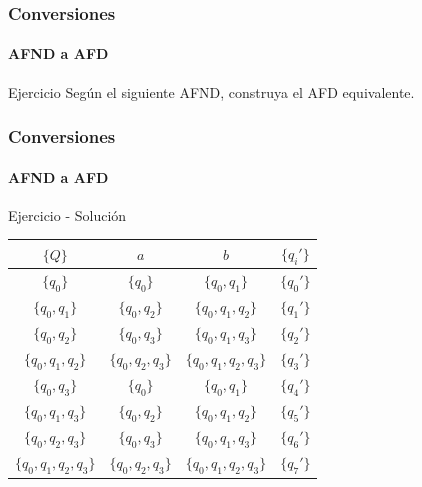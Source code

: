 \documentclass{beamer}
\begin{document}
        \begin{frame}
			\frametitle{Conversiones}
			\framesubtitle{AFND a AFD}

            \begin{exampleblock}{Ejercicio}
               Seg\'un el siguiente AFND, construya el AFD equivalente.
               \begin{center}
			   \end{center}
            \end{exampleblock}
		\end{frame}		
		
        \begin{frame}
			\frametitle{Conversiones}
			\framesubtitle{AFND a AFD}

            \begin{exampleblock}{Ejercicio - Soluci\'on}
               \begin{table}
                   \begin{center}
                       \begin{tabular}{c|c|c|c} 
                           $\{Q\}$ & $a$ & $b$ & $\{q_{i}'\}$ \\ \hline
                           $\{q_{0}\}$ & $\{q_{0}\}$ & $\{q_{0},q_{1}\}$ & $\{q_{0}'\}$ \\
                           $\{q_{0}, q_{1}\}$ & $\{q_{0}, q_{2}\}$ & $\{q_{0}, q_{1}, q_{2}\}$ & $\{q_{1}'\}$ \\
                           $\{q_{0}, q_{2}\}$ & $\{q_{0}, q_{3}\}$ & $\{q_{0}, q_{1}, q_{3}\}$ & $\{q_{2}'\}$ \\
                           $\{q_{0}, q_{1}, q_{2}\}$ & $\{q_{0}, q_{2}, q_{3}\}$ & $\{q_{0}, q_{1}, q_{2}, q_{3}\}$ & $\{q_{3}'\}$ \\
                           $\{q_{0}, q_{3}\}$ & $\{q_{0}\}$ & $\{q_{0},q_{1}\}$ & $\{q_{4}'\}$ \\
                           $\{q_{0}, q_{1}, q_{3}\}$ & $\{q_{0}, q_{2}\}$ & $\{q_{0}, q_{1}, q_{2}\}$ & $\{q_{5}'\}$ \\
                           $\{q_{0}, q_{2}, q_{3}\}$ & $\{q_{0}, q_{3}\}$ & $\{q_{0}, q_{1}, q_{3}\}$ & $\{q_{6}'\}$ \\
                           $\{q_{0}, q_{1}, q_{2}, q_{3}\}$& $\{q_{0}, q_{2}, q_{3}\}$ & $\{q_{0}, q_{1}, q_{2}, q_{3}\}$ & $\{q_{7}'\}$ \\
                       \end{tabular}
                   \end{center}
               \end{table}
            \end{exampleblock}
		\end{frame}				
		
\end{document}
